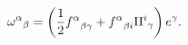 \begin{equation}{\omega^\alpha}_\beta=\left({1\over 2}{f^{\alpha}}_{\beta\gamma} +
{f^{\alpha}}_{\beta i}{\Pi^i}_\gamma\right)e^\gamma.\end{equation}

